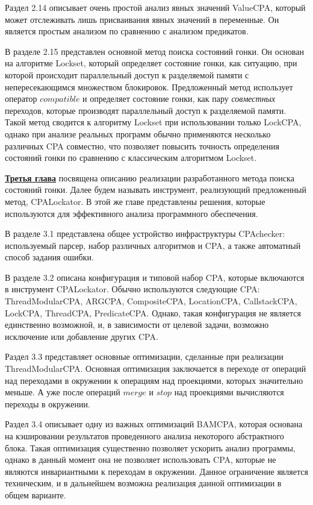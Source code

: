 Раздел 2.14 описывает очень простой анализ явных значений ValueCPA, который может отслеживать лишь присваивания явных значений в переменные.
Он является простым анализом по сравнению с анализом предикатов.

В разделе 2.15 представлен основной метод поиска состояний гонки. 
Он основан на алгоритме Lockset, который определяет состояние гонки, как ситуацию, при которой происходит параллельный доступ к разделяемой памяти с непересекающимся множеством блокировок.
Предложенный метод использует оператор $compatible$ и определяет состояние гонки, как пару \textit{совместных} переходов, которые производят параллельный доступ к разделяемой памяти.
Такой метод сводится к алгоритму Lockset при использовании только LockCPA, однако при анализе реальных программ обычно применяются несколько различных CPA совместно, что позволяет повысить точность определения состояний гонки по сравнению с классическим алгоритмом Lockset.

\underline{\textbf{Третья глава}} посвящена описанию реализации разработанного метода поиска состояний гонки.
Далее будем называть инструмент, реализующий предложенный метод, CPALockator.
В этой же главе представлены решения, которые используются для эффективного анализа программного обеспечения.

В разделе 3.1 представлена общее устройство инфраструктуры CPAchecker: используемый парсер, набор различных алгоритмов и CPA, а также автоматный способ задания ошибки.

В разделе 3.2 описана конфигурация и типовой набор CPA, которые включаются в инструмент CPALockator.
Обычно используются следующие CPA: ThreadModularCPA, ARGCPA, CompositeCPA, LocationCPA, CallstackCPA, LockCPA, ThreadCPA, PredicateCPA.
Однако, такая конфигурация не является единственно возможной, и, в зависимости от целевой задачи, возможно исключение или добавление других CPA.

Раздел 3.3 представляет основные оптимизации, сделанные при реализации ThreadModularCPA. 
Основная оптимизация заключается в переходе от операций над переходами в окружении к операциям над проекциями, которых значительно меньше.
А уже после операций $merge$ и $stop$ над проекциями вычисляются переходы в окружении.

Раздел 3.4 описывает одну из важных оптимизаций BAMCPA, которая основана на кэшировании результатов проведенного анализа некоторого абстрактного блока.
Такая оптимизация существенно позволяет ускорить анализ программы, однако в данный момент она не позволяет использовать CPA, которые не являются инвариантными к переходам в окружении.
Данное ограничение является техническим, и в дальнейшем возможна реализация данной оптимизации в общем варианте.

